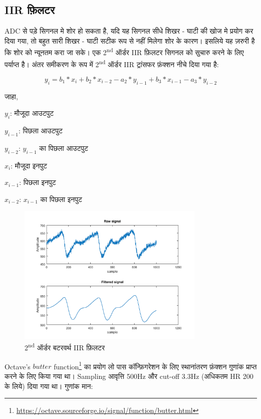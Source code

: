 	\subsection{IIR फ़िलटर}

		ADC से पड़े सिगनल मे शोर हो सकता है, यदि यह सिगनल सीधे शिखर - घाटी की खोज मे प्रयोग कर दिया गया, तो बहुत सारी शिखर - घाटी सटीक रूप से नहीं मिलेगा शोर के कारण। इसलिये यह ज़रुरी है कि शोर को न्यूनतम करा जा सके। 
		एक 2\textsuperscript{nd} ऑर्डर IIR फ़िलटर सिगनल को सुचारु करने के लिए पर्याप्त है। अंतर समीकरण के रूप में 2\textsuperscript{nd} ऑर्डर IIR ट्रांसफर फ़ंक्शन नीचे दिया गया है:
		
		\[
		y_i = b_1*x_i + b_2*x_{i-2} - a_2*y_{i-1} + b_3*x_{i-1} - a_3*y_{i-2}
		\]
		
		जाहा,
		
		$y_i$: मौजूदा आउटपुट
		
		$y_{i-1}$: पिछला आउटपुट
		
		$y_{i-2}$: $y_{i-1}$ का पिछला आउटपुट
		
		$x_i$: मौजूदा इनपुट
		
		$x_{i-1}$: पिछला इनपुट
		
		$x_{i-2}$: $x_{i-1}$ का पिछला इनपुट
		
		\begin{figure}[ht!]
			\centering
			\includegraphics[width=0.8\textwidth]{../common/algo/filter.png}
			\caption{2\textsuperscript{nd} ऑर्डर बटरवर्थ IIR फ़िलटर}
			\label{fig:filter}
		\end{figure}
		
		Octave's $butter$ function\footnote{\url{https://octave.sourceforge.io/signal/function/butter.html}} का प्रयोग लो पास कॉन्फ़िगरेशन के लिए स्थानांतरण फ़ंक्शन गुणांक प्राप्त करने के लिए किया गया था।  Sampling आवृत्ति 500Hz और cut-off 3.3Hz (अधिकतम HR 200 के लिये) दिया गया था। गुणांक मान:
		
